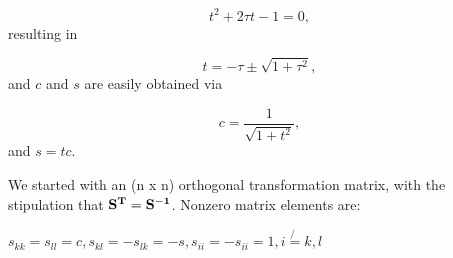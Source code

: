 \documentclass[10pt,showpacs,preprintnumbers,footinbib,amsmath,amssymb,aps,prl,twocolumn,groupedaddress,superscriptaddress,showkeys]{revtex4-1}
\begin{document}
\begin{equation*}
t^2+2\tau t-1= 0,
\end{equation*}
resulting in

\begin{equation*}
t = -\tau \pm \sqrt{1+\tau^2},
\end{equation*}
and $c$ and $s$ are easily obtained via

\begin{equation*}
c = \frac{1}{\sqrt{1+t^2}},
\end{equation*}
and $s=tc$.  

We started with an (n x n) orthogonal transformation matrix, with the stipulation that  $\bold{S^T}=\bold{S^{-1}}$.
Nonzero matrix elements are:

$s_{kk}=s_{ll}=c,s_{kl}=-s_{lk}=-s,s_{ii}=-s_{ii}= 1,  i\not{=}k, l$
\end{document}
